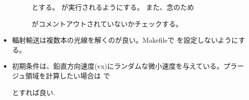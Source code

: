 \documentclass[letterpaper,10pt,dvipdfmx,report]{sphinxmanual}
\begin{document}
\begin{itemize}
\begin{description}
\begin{sphinxVerbatim}[commandchars=\\\{\}]

\end{sphinxVerbatim}

\sphinxAtStartPar
とする。  が実行されるようにする。
また、念のため

\begin{sphinxVerbatim}[commandchars=\\\{\}]
\end{sphinxVerbatim}

\sphinxAtStartPar
がコメントアウトされていないかチェックする。

\end{description}

\item {} \begin{description}
\sphinxAtStartPar
輻射輸送は複数本の光線を解くのが良い。Makefileで  を設定しないようにする。

\end{description}

\item {} \begin{description}
\sphinxAtStartPar
初期条件は、鉛直方向速度(vx)にランダムな微小速度を与えている。プラージュ領域を計算したい場合は
 で

\begin{sphinxVerbatim}[commandchars=\\\{\}]
\end{sphinxVerbatim}

\sphinxAtStartPar
とすれば良い.

\end{description}


\end{itemize}
\end{document}

